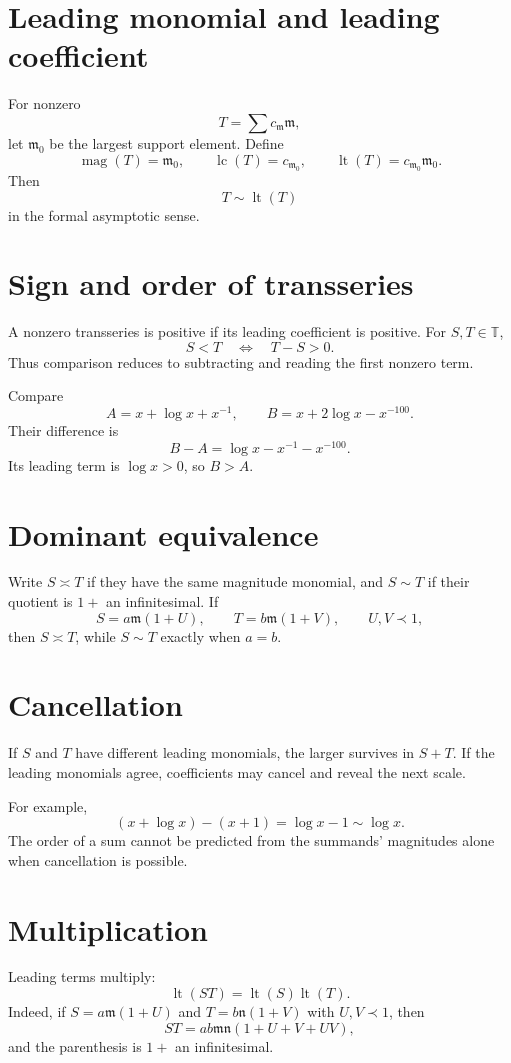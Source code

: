 \documentclass[11pt,oneside,openany]{book}
\newcommand{\T}{\mathbb{T}}
\newcommand{\magop}{\operatorname{mag}}
\newcommand{\mon}{\mathfrak{m}}
\newcommand{\nmon}{\mathfrak{n}}
\theoremstyle{plain}
\theoremstyle{definition}
\theoremstyle{remark}
\begin{document}
\section{Leading monomial and leading coefficient}
For nonzero
\[
  T=\sum c_\mon\mon,
\]
let $\mon_0$ be the largest support element. Define
\[
  \magop(T)=\mon_0,
  \qquad
  \operatorname{lc}(T)=c_{\mon_0},
  \qquad
  \operatorname{lt}(T)=c_{\mon_0}\mon_0.
\]
Then
\[
  T\sim\operatorname{lt}(T)
\]
in the formal asymptotic sense.

\section{Sign and order of transseries}
A nonzero transseries is positive if its leading coefficient is positive. For $S,T\in\T$,
\[
  S<T\quad\Longleftrightarrow\quad T-S>0.
\]
Thus comparison reduces to subtracting and reading the first nonzero term.

\begin{worked}
Compare
\[
  A=x+\log x+x^{-1},
  \qquad
  B=x+2\log x-x^{-100}.
\]
Their difference is
\[
  B-A=\log x-x^{-1}-x^{-100}.
\]
Its leading term is $\log x>0$, so $B>A$.
\end{worked}

\section{Dominant equivalence}
Write $S\asymp T$ if they have the same magnitude monomial, and $S\sim T$ if their quotient is $1+$ an infinitesimal. If
\[
  S=a\mon(1+U),
  \qquad T=b\mon(1+V),
  \qquad U,V\prec1,
\]
then $S\asymp T$, while $S\sim T$ exactly when $a=b$.

\section{Cancellation}
If $S$ and $T$ have different leading monomials, the larger survives in $S+T$. If the leading monomials agree, coefficients may cancel and reveal the next scale.

For example,
\[
  (x+\log x)-(x+1)=\log x-1\sim\log x.
\]
The order of a sum cannot be predicted from the summands' magnitudes alone when cancellation is possible.

\section{Multiplication}
Leading terms multiply:
\[
  \operatorname{lt}(ST)=
  \operatorname{lt}(S)\operatorname{lt}(T).
\]
Indeed, if $S=a\mon(1+U)$ and $T=b\nmon(1+V)$ with $U,V\prec1$, then
\[
  ST=ab\mon\nmon(1+U+V+UV),
\]
and the parenthesis is $1+$ an infinitesimal.
\end{document}
